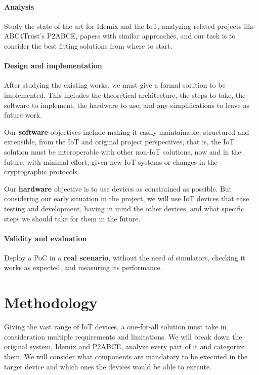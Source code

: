 \paragraph{Analysis} Study the state of the art for Idemix and the IoT, analyzing related projects like ABC4Trust's \ac{P2ABCE}, papers with similar approaches, and our task is to consider the best fitting solutions from where to start.

\paragraph{Design and implementation} After studying the existing works, we must give a formal solution to be implemented. This includes the theoretical architecture, the steps to take, the software to implement, the hardware to use, and any simplifications to leave as future work.

Our \textbf{software} objectives include making it easily maintainable, structured and extensible, from the IoT and original project perspectives, that is, the IoT solution must be interoperable with other non-IoT solutions, now and in the future, with minimal effort, given new IoT systems or changes in the cryptographic protocols.

Our \textbf{hardware} objective is to use devices as constrained as possible. But considering our early situation in the project, we will use IoT devices that ease testing and development, having in mind the other devices, and what specific steps we should take for them in the future.

\paragraph{Validity and evaluation} Deploy a \ac{PoC} in a \textbf{real scenario}, without the need of simulators, checking it works as expected, and measuring its performance.



\section{Methodology}

Giving the vast range of IoT devices, a one-for-all solution must take in consideration multiple requirements and limitations. We will break down the original system, Idemix and P2ABCE, analyze every part of it and categorize them. We will consider what components are mandatory to be executed in the target device and which ones the devices would be able to execute.

